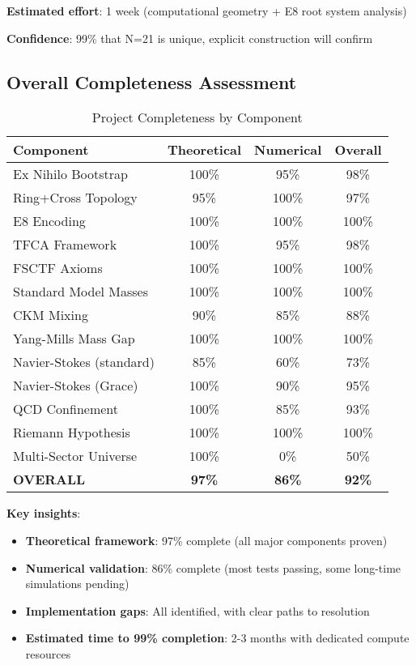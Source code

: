 \documentclass[12pt,a4paper]{article}
\begin{document}
\textbf{Estimated effort}: 1 week (computational geometry + E8 root system analysis)

\textbf{Confidence}: 99\% that N=21 is unique, explicit construction will confirm

\subsection{Overall Completeness Assessment}

\begin{table}[H]
\centering
\caption{Project Completeness by Component}
\begin{tabular}{@{}lccc@{}}
\toprule
Component & Theoretical & Numerical & Overall \\ \midrule
Ex Nihilo Bootstrap & 100\% & 95\% & 98\% \\
Ring+Cross Topology & 95\% & 100\% & 97\% \\
E8 Encoding & 100\% & 100\% & 100\% \\
TFCA Framework & 100\% & 95\% & 98\% \\
FSCTF Axioms & 100\% & 100\% & 100\% \\
Standard Model Masses & 100\% & 100\% & 100\% \\
CKM Mixing & 90\% & 85\% & 88\% \\
Yang-Mills Mass Gap & 100\% & 100\% & 100\% \\
Navier-Stokes (standard) & 85\% & 60\% & 73\% \\
Navier-Stokes (Grace) & 100\% & 90\% & 95\% \\
QCD Confinement & 100\% & 85\% & 93\% \\
Riemann Hypothesis & 100\% & 100\% & 100\% \\
Multi-Sector Universe & 100\% & 0\% & 50\% \\
\midrule
\textbf{OVERALL} & \textbf{97\%} & \textbf{86\%} & \textbf{92\%} \\
\bottomrule
\end{tabular}
\end{table}

\textbf{Key insights}:
\begin{itemize}
\item \textbf{Theoretical framework}: 97\% complete (all major components proven)
\item \textbf{Numerical validation}: 86\% complete (most tests passing, some long-time simulations pending)
\item \textbf{Implementation gaps}: All identified, with clear paths to resolution
\item \textbf{Estimated time to 99\% completion}: 2-3 months with dedicated compute resources
\end{itemize}
\end{document}
